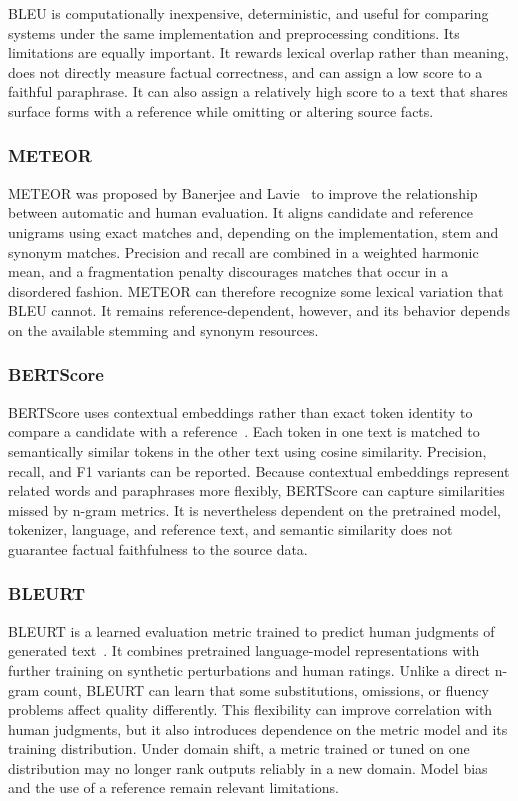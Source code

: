 BLEU is computationally inexpensive, deterministic, and useful for comparing systems under the
same implementation and preprocessing conditions. Its limitations are equally
important. It rewards lexical overlap rather than meaning, does not directly
measure factual correctness, and can assign a low score to a faithful
paraphrase. It can also assign a relatively high score to a text that shares
surface forms with a reference while omitting or altering source facts.

\subsubsection{METEOR}

METEOR was proposed by Banerjee and Lavie~\cite{banerjee2005meteor} to improve
the relationship between automatic and human evaluation. It aligns candidate
and reference unigrams using exact matches and, depending on the implementation,
stem and synonym matches. Precision and recall are combined in a weighted
harmonic mean, and a fragmentation penalty discourages matches that occur in a
disordered fashion. METEOR can therefore recognize some lexical variation that
BLEU cannot. It remains reference-dependent, however, and its behavior depends
on the available stemming and synonym resources.

\subsubsection{BERTScore}

BERTScore uses contextual embeddings rather than exact token identity to
compare a candidate with a reference~\cite{zhang2020bertscore}. Each token in
one text is matched to semantically similar tokens in the other text using
cosine similarity. Precision, recall, and F1 variants can be reported. Because
contextual embeddings represent related words and paraphrases more flexibly,
BERTScore can capture similarities missed by n-gram metrics. It is nevertheless
dependent on the pretrained model, tokenizer, language, and reference text, and
semantic similarity does not guarantee factual faithfulness to the source data.

\subsubsection{BLEURT}

BLEURT is a learned evaluation metric trained to predict human judgments of
generated text~\cite{sellam2020bleurt}. It combines pretrained language-model
representations with further training on synthetic perturbations and human
ratings. Unlike a direct n-gram count, BLEURT can learn that some substitutions,
omissions, or fluency problems affect quality differently. This flexibility can
improve correlation with human judgments, but it also introduces dependence on
the metric model and its training distribution. Under domain shift, a metric
trained or tuned on one distribution may no longer rank outputs reliably in a
new domain. Model bias and the use of a reference remain relevant limitations.

